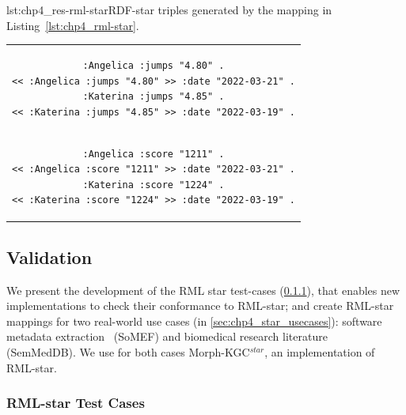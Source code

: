 \noindent\hspace{0.1\linewidth}\begin{minipage}{\linewidth}
\begin{captionedlisting}{lst:chp4_res-rml-star}{RDF-star triples generated by the mapping in Listing~\ref{lst:chp4_rml-star}.}
\centering
\begin{tabular}{c}
\hspace{2em}
{\begin{lstlisting}[basicstyle=\ttfamily\small,label={list:example1},columns=flexible]
:Angelica :jumps "4.80" .
<< :Angelica :jumps "4.80" >> :date "2022-03-21" .
:Katerina :jumps "4.85" .
<< :Katerina :jumps "4.85" >> :date "2022-03-19" .
\end{lstlisting}}\\
\hspace{2em}
{\begin{lstlisting}[basicstyle=\ttfamily\small,label={list:example1},columns=flexible,frame=l,rulecolor=\color{red},framerule=0.75pt,firstnumber=5]
:Angelica :score "1211" .
<< :Angelica :score "1211" >> :date "2022-03-21" .
:Katerina :score "1224" .
<< :Katerina :score "1224" >> :date "2022-03-19" .
\end{lstlisting}}

\end{tabular}
\end{captionedlisting}
\end{minipage}





\subsection{Validation}
\label{sec:chp4_validation}

We present the development of the RML star test-cases (\cref{sec:chp4_star_testcases}), that enables new implementations to check their conformance to RML-star; and create RML-star mappings for two real-world use cases (in \cref{sec:chp4_star_usecases}): software metadata extraction~\citep{kelley2021framework} (SoMEF) and biomedical research literature~\citep{SemMedDB} (SemMedDB). We use for both cases \mbox{Morph-KGC$^{star}$}, an implementation of RML-star.




\subsubsection{RML-star Test Cases}
\label{sec:chp4_star_testcases}

